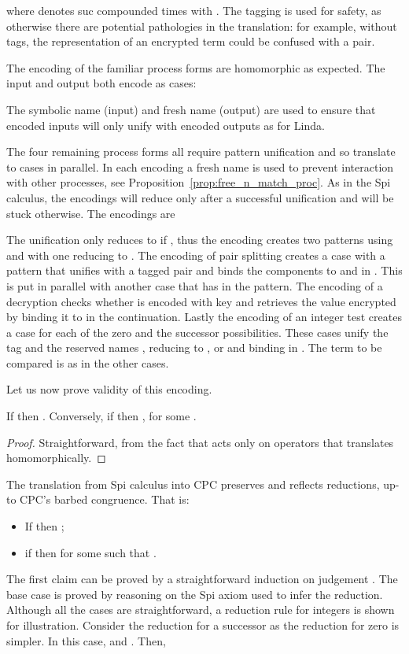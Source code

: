 \documentclass{LMCS}
\begin{document}
where  denotes {\sf suc} compounded  times with .
The tagging is used for safety, as otherwise there are potential
pathologies in the translation: for example,
without tags, the representation of an encrypted term could be confused
with a pair.

The encoding of the familiar process forms are homomorphic as expected. The input and output
both encode as cases:

The symbolic name  (input) and fresh name  (output) are used to
ensure that encoded inputs will only unify with encoded outputs as for Linda.

The four remaining process forms all require pattern unification and so
translate to cases in parallel. In each encoding a fresh name  is
used to prevent interaction with other processes, see
Proposition~\ref{prop:free_n_match_proc}. As in the Spi calculus,
the encodings will reduce only after a successful unification and will be
stuck otherwise. The encodings are

The unification  only reduces to  if , thus the
encoding creates two patterns using  and  with one reducing to .  The encoding of pair splitting  
creates a case with a pattern that unifies with a tagged pair and binds the
components to  and  in . This is put in parallel with
another case that has  in the pattern. The encoding of a decryption  checks
whether  is encoded with key  and
retrieves the value encrypted by binding it to  in the continuation.
Lastly the encoding of an integer test  creates a case for each of the zero and the
successor possibilities. These cases unify the tag and the reserved
names , reducing to , or  and binding  in
. The term to be compared  is as in the other cases.

Let us now prove validity of this encoding.

\begin{lem}
\label{lem:structenc-spi}
If  then .
Conversely, if  then , for some .
\end{lem}
\begin{proof}
Straightforward, from the fact that  acts only on operators that  translates homomorphically.
\end{proof}

\begin{thm}
\label{spi2cpc-red}
The translation  from Spi calculus into CPC preserves and reflects reductions, up-to CPC's barbed
congruence. That is:
\begin{itemize}
	\item If  then ;
	\item if  then  for some  such that .
\end{itemize}
\end{thm}
\proof
The first claim can be proved by a straightforward induction
on judgement . The base case is proved by reasoning on the Spi axiom used to infer the reduction.
Although all the cases are straightforward, a reduction rule for integers is shown for illustration.
Consider the reduction for a successor as the reduction for zero is simpler.
In this case, 
and . Then, 
\end{document}
